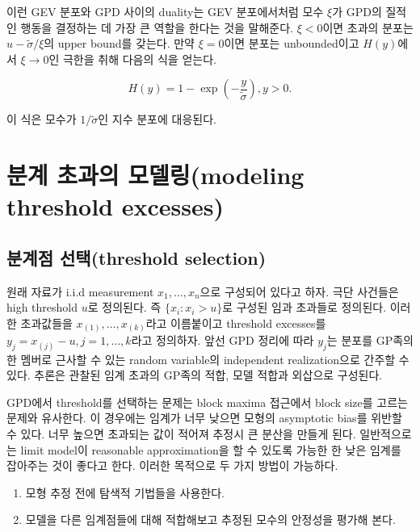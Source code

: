 \documentclass[b5paper,]{scrbook}
\theoremstyle{plain}
\theoremstyle{definition}
\numberwithin{equation}{section}
\begin{document}
이런 GEV 분포와 GPD 사이의 duality는 GEV 분포에서처럼 모수 \(\xi\)가 GPD의 질적인 행동을 결정하는 데 가장 큰 역할을 한다는 것을 말해준다. \(\xi<0\)이면 초과의 분포는 \(u-\tilde{\sigma}/\xi\)의 upper bound를 갖는다. 만약 \(\xi=0\)이면 분포는 unbounded이고 \(H(y)\)에서 \(\xi \rightarrow 0\)인 극한을 취해 다음의 식을 얻는다.

\[H(y)=1-\exp(-\frac{y}{\tilde{\sigma}}), y > 0.\]

이 식은 모수가 \(1/\tilde{\sigma}\)인 지수 분포에 대응된다.

\hypertarget{--modeling-threshold-excesses}{%
\section{분계 초과의 모델링(modeling threshold excesses)}\label{--modeling-threshold-excesses}}

\hypertarget{-threshold-selection}{%
\subsection{분계점 선택(threshold selection)}\label{-threshold-selection}}

원래 자료가 i.i.d measurement \(x_{1}, \ldots, x_{n}\)으로 구성되어 있다고 하자. 극단 사건들은 high threshold \(u\)로 정의된다. 즉 \(\{x_{i}: x_{i}>u\}\)로 구성된 임과 초과들로 정의된다. 이러한 초과값들을 \(x_{(1)}, \ldots , x_{(k)}\)라고 이름붙이고 threshold excesses를 \(y_{j}=x_{(j)}-u, j=1,\ldots, k\)라고 정의하자. 앞선 GPD 정리에 따라 \(y_{j}\)는 분포를 GP족의 한 멤버로 근사할 수 있는 random variable의 independent realization으로 간주할 수 있다. 추론은 관찰된 임계 초과의 GP족의 적합, 모델 적합과 외삽으로 구성된다.

GPD에서 threshold를 선택하는 문제는 block maxima 접근에서 block size를 고르는 문제와 유사한다. 이 경우에는 임계가 너무 낮으면 모형의 asymptotic bias를 위반할 수 있다. 너무 높으면 초과되는 값이 적어져 추정시 큰 분산을 만들게 된다. 일반적으로는 limit model이 reasonable approximation을 할 수 있도록 가능한 한 낮은 임계를 잡아주는 것이 좋다고 한다. 이러한 목적으로 두 가지 방법이 가능하다.

\begin{enumerate}
\def\labelenumi{\arabic{enumi}.}
\item
  모형 추정 전에 탐색적 기법들을 사용한다.
\item
  모델을 다른 임계점들에 대해 적합해보고 추정된 모수의 안정성을 평가해 본다.
\end{enumerate}
\end{document}
